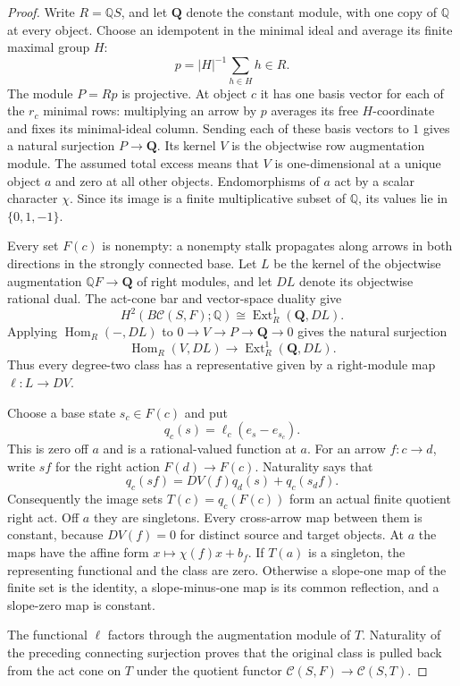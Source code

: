 \begin{proof}
Write $R=\mathbb QS$, and let $\mathbf Q$ denote the constant
module, with one copy of $\mathbb Q$ at every object.  Choose
an idempotent in the minimal ideal and average its finite
maximal group $H$:
\[
 p=|H|^{-1}\sum_{h\in H}h\in R.
\]
The module $P=Rp$ is projective.  At object $c$ it has one
basis vector for each of the $r_c$ minimal rows: multiplying
an arrow by $p$ averages its free $H$-coordinate and fixes
its minimal-ideal column.  Sending each of these basis vectors
to $1$ gives a natural surjection $P\to\mathbf Q$.
Its kernel $V$ is the objectwise row augmentation module.
The assumed total excess means that $V$ is one-dimensional
at a unique object $a$ and zero at all other objects.
Endomorphisms of $a$ act by a scalar character $\chi$.
Since its image is a finite multiplicative subset of
$\mathbb Q$, its values lie in $\{0,1,-1\}$.

Every set $F(c)$ is nonempty: a nonempty stalk propagates
along arrows in both directions in the strongly connected
base.  Let $L$ be the kernel of the objectwise augmentation
$\mathbb QF\to\mathbf Q$ of right modules, and let $D L$
denote its objectwise rational dual.  The act-cone bar and
vector-space duality give
\[
 H^2(B\mathcal C(S,F);\mathbb Q)
 \cong\operatorname{Ext}^1_R(\mathbf Q,D L).
\]
Applying $\operatorname{Hom}_R(-,D L)$ to
$0\to V\to P\to\mathbf Q\to0$ gives the natural
surjection
\[
 \operatorname{Hom}_R(V,D L)\longrightarrow
 \operatorname{Ext}^1_R(\mathbf Q,D L).
\]
Thus every degree-two class has a representative given by
a right-module map $\ell:L\to D V$.

Choose a base state $s_c\in F(c)$ and put
\[
 q_c(s)=\ell_c(e_s-e_{s_c}).
\]
This is zero off $a$ and is a rational-valued function at $a$.
For an arrow $f:c\to d$, write $s f$ for the right action
$F(d)\to F(c)$.  Naturality says that
\[
 q_c(s f)=D V(f)q_d(s)+q_c(s_d f).
\]
Consequently the image sets $T(c)=q_c(F(c))$ form an actual
finite quotient right act.  Off $a$ they are singletons.
Every cross-arrow map between them is constant, because
$D V(f)=0$ for distinct source and target objects.  At $a$
the maps have the affine form $x\mapsto\chi(f)x+b_f$.
If $T(a)$ is a singleton, the representing functional and
the class are zero.  Otherwise a slope-one map of the finite
set is the identity, a slope-minus-one map is its common
reflection, and a slope-zero map is constant.

The functional $\ell$ factors through the augmentation
module of $T$.  Naturality of the preceding connecting
surjection proves that the original class is pulled back
from the act cone on $T$ under the quotient functor
$\mathcal C(S,F)\to\mathcal C(S,T)$.


\end{proof}
